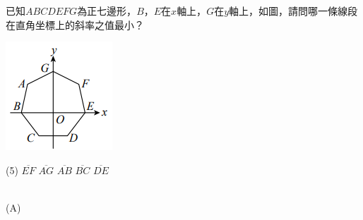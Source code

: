 \documentclass
[answers]
{exam}
\theoremstyle{definition}
\begin{document}
\begin{questions}
\question


\begin{minipage}[t]{0.7\linewidth}
	已知$ABCDEFG$為正七邊形，$B$，$E$在$x$軸上，$G$在$y$軸上，如圖，請問哪一條線段在直角坐標上的斜率之值最小？
\end{minipage}
\hfill
\begin{minipage}[t]{0.3\linewidth}
	\vspace*{-0.3cm}
	\includegraphics[scale=1]{./chapter_3/figure/1.png}
	\raggedleft %
\end{minipage}

\begin{tasks}(5)
	\task $\overline{EF}$
	\task $\overline{AG}$
	\task $\overline{AB}$
	\task $\overline{BC}$
	\task $\overline{DE}$
\end{tasks}
\begin{solution}~\\
	(A)
\end{solution}





\question


\end{questions}
\end{document}
